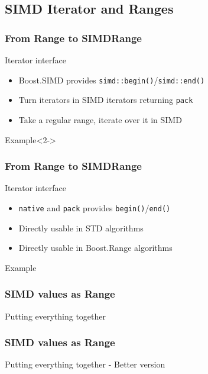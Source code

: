 \subsection{SIMD Iterator and Ranges}
\frame
{
  \frametitle{From Range to SIMDRange}
  \begin{block}{Iterator interface}
  \begin{itemize}
  \item Boost.SIMD provides \texttt{simd::begin()}/\texttt{simd::end()}
  \item Turn iterators in SIMD iterators returning \texttt{pack}
  \item Take a regular range, iterate over it in SIMD
  \end{itemize}
  \end{block}

  \begin{block}{Example}<2->
  \begin{center}
  \end{center}
  \end{block}
}

\frame
{
  \frametitle{From Range to SIMDRange}
  \begin{block}{Iterator interface}
  \begin{itemize}
  \item \texttt{native} and \texttt{pack} provides \texttt{begin()}/\texttt{end()}
  \item Directly usable in STD algorithms
  \item Directly usable in Boost.Range algorithms
  \end{itemize}
  \end{block}{}

  \begin{block}{Example}
  \begin{center}
  \lstpackrange
  \end{center}
  \end{block}{}
}

\frame
{
  \frametitle{SIMD values as Range}
  \begin{block}{Putting everything together}
  \begin{center}
  \lstranges
  \end{center}
  \end{block}{}
}

\frame
{
  \frametitle{SIMD values as Range}
  \begin{block}{Putting everything together - Better version}
  \begin{center}
  \lstrangesb
  \end{center}
  \end{block}{}
}
